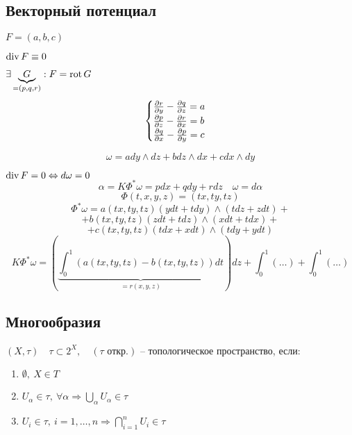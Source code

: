     \subsection*{Векторный потенциал}

    \par $F = (a, b, c)$
    \par $\operatorname{div} F \equiv 0$
    \par $\exists \underbrace{G}_{=(p, q, r)} : F = \operatorname{rot} G$
    \[
        \begin{cases}
            \frac{\partial r}{\partial y} - \frac{\partial q}{\partial z} = a \\
            \frac{\partial p}{\partial z} - \frac{\partial r}{\partial x} = b \\
            \frac{\partial q}{\partial x} - \frac{\partial p}{\partial y} = c
        \end{cases}    
    \]

    \[
        \omega = a dy \wedge dz + b dz \wedge dx + c dx \wedge dy    
    \]
    \par $\operatorname{div} F = 0 \Leftrightarrow d \omega = 0$
    \[
        \alpha = K \Phi^* \omega = pdx + qdy + rdz \quad \omega = d \alpha    
    \]
    \[
        \Phi(t, x, y, z) = (tx, ty, tz)    
    \]
    \[
        \Phi^* \omega = a(tx, ty, tz) (ydt + tdy) \wedge (tdz + zdt) +    
    \]
    \[
        + b(tx, ty, tz) (zdt + tdz) \wedge (xdt + tdx) +    
    \]
    \[
        + c(tx, ty, tz) (tdx + xdt) \wedge (tdy + ydt)    
    \]
    \[
        K \Phi^* \omega = (\underbrace{\int_0^1 (a(tx, ty, tz) - b(tx, ty, tz))dt}_{= r(x, y, z)})dz +  \int_0^1 (\dots) + \int_0^1 (\dots)
    \]

    \subsection*{Многообразия}

    \begin{definition}
        $(X, \tau) \quad \tau \subset 2^X, \quad (\tau \text{ откр.})$ -- топологическое пространство, если:
        \begin{enumerate}
            \item $\emptyset, \ X \in T$
            \item $U_\alpha \in \tau, \ \forall \alpha \Rightarrow \bigcup_\alpha U_\alpha \in \tau$
            \item $U_i \in \tau, \ i = 1, \dots, n \Rightarrow \bigcap_{i=1}^n U_i \in \tau$
        \end{enumerate}
    \end{definition}


